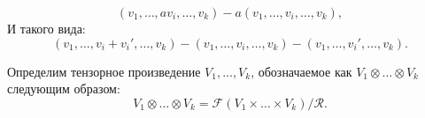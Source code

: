 \[
    (v_1, \ldots, a v_i, \ldots, v_k) - a(v_1, \ldots, v_i, \ldots, v_k),
\]
И такого вида:
\[
    (v_1, \ldots, v_i + v_i', \ldots, v_k) - (v_1, \ldots, v_i, \ldots, v_k) - (v_1, \ldots, v_i', \ldots, v_k).
\]
\begin{definition}
    Определим тензорное произведение $V_1, \ldots, V_k$, обозначаемое как $V_1 \otimes \ldots \otimes V_k$ следующим образом:
    \[
        V_1 \otimes \ldots \otimes V_k = \mathcal{F}(V_1 \times \ldots \times V_k)/\mathcal{R}.
    \]
\end{definition}


